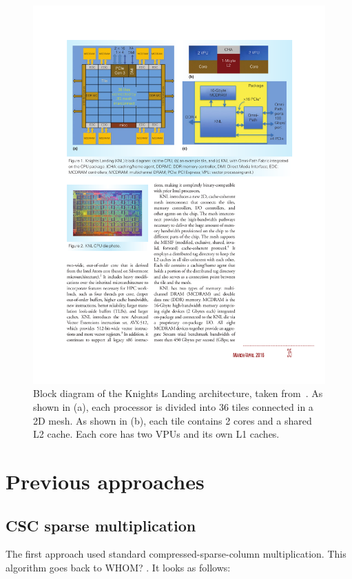 \begin{figure}[tb]
\centering
\includegraphics[width=\textwidth]{images/knl_arch.pdf}
\caption{Block diagram of the Knights Landing architecture, taken from~\cite{Sodani:2016:KLS:2927511.2927563}. As shown in (a), each processor is divided into 36 tiles connected in a 2D mesh. As shown in (b), each tile contains 2 cores and a shared L2 cache. Each core has two VPUs and its own L1 caches.}
\end{figure}

\section{Previous approaches}

\subsection{CSC sparse multiplication}
  The first approach used standard compressed-sparse-column multiplication. This algorithm goes back to WHOM? . It looks as follows:


